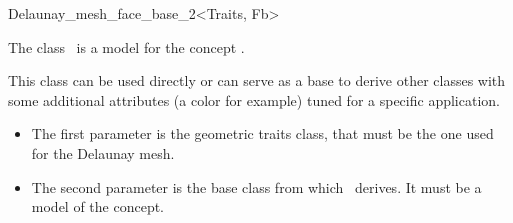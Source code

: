 \begin{ccRefClass}{Delaunay_mesh_face_base_2<Traits, Fb>}

\ccDefinition

The class \ccRefName\ is a model for the concept
.

This class can be used directly or can serve as a base to derive other
classes with some additional attributes (a color for example) tuned for a
specific application.


\ccParameters

\begin{itemize}
\item The first parameter  is the geometric traits class, that must
  be the one used for the Delaunay mesh.
\item The second parameter  is the base class from which \ccRefName\ 
  derives. It must be a model of the  concept.
\end{itemize}
\ccInheritsFrom
{}

\ccIsModel
{}
\end{ccRefClass}

